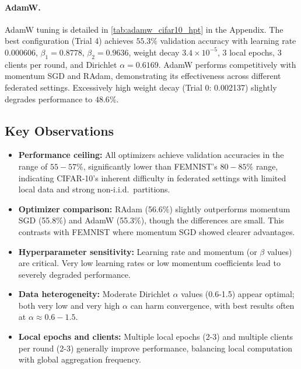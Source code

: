 \documentclass[10pt,twocolumn,letterpaper]{article}
\begin{document}
    \paragraph{AdamW.}
    AdamW tuning is detailed in \cref{tab:adamw_cifar10_hpt} in the Appendix.
    The best configuration (Trial 4) achieves $55.3\%$ validation accuracy
    with learning rate 0.000606, $\beta_1=0.8778$, $\beta_2=0.9636$, weight
    decay $3.4 \times 10^{-5}$, 3 local epochs, 3 clients per round, and
    Dirichlet $\alpha=0.6169$.
    AdamW performs competitively with momentum SGD and RAdam, demonstrating
    its effectiveness across different federated settings.
    Excessively high weight decay (Trial 0: 0.002137) slightly degrades
    performance to $48.6\%$.

    \subsection{Key Observations}

    \begin{itemize}
        \item \textbf{Performance ceiling:} All optimizers achieve validation
        accuracies in the range of $55-57\%$, significantly lower than
        FEMNIST's $80-85\%$ range, indicating CIFAR-10's inherent difficulty
        in federated settings with limited local data and strong non-i.i.d.\
        partitions.
        \item \textbf{Optimizer comparison:} RAdam (56.6\%) slightly
        outperforms momentum SGD (55.8\%) and AdamW (55.3\%), though the
        differences are small. This contrasts with FEMNIST where momentum
        SGD showed clearer advantages.
        \item \textbf{Hyperparameter sensitivity:} Learning rate and momentum
        (or $\beta$ values) are critical. Very low learning rates or low
        momentum coefficients lead to severely degraded performance.
        \item \textbf{Data heterogeneity:} Moderate Dirichlet $\alpha$ values
        (0.6-1.5) appear optimal; both very low and very high $\alpha$ can
        harm convergence, with best results often at $\alpha \approx 0.6-1.5$.
        \item \textbf{Local epochs and clients:} Multiple local epochs (2-3)
        and multiple clients per round (2-3) generally improve performance,
        balancing local computation with global aggregation frequency.
    \end{itemize}
\end{document}
